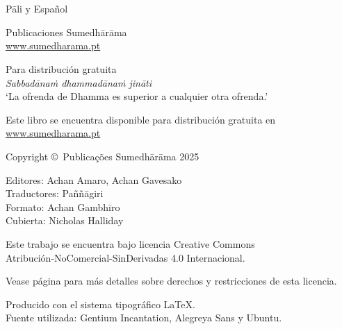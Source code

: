
\thispagestyle{empty}

\enlargethispage{\baselineskip}

{\centering\small
\setlength{\parskip}{15pt}

{\normalsize
\thetitle\\
\thesubtitle\\
Pāli y Español}

Publicaciones Sumedhārāma\\
\href{http://sumedharama.pt}{www.sumedharama.pt}

Para distribución gratuita\\
\textit{Sabbadānaṁ dhammadānaṁ jināti}\\
‘La ofrenda de Dhamma es superior a cualquier otra ofrenda.’

Este libro se encuentra disponible para distribución gratuita en\\
\href{http://sumedharama.pt}{www.sumedharama.pt}


Copyright \copyright\ Publicações Sumedhārāma 2025

Editores: Achan Amaro, Achan Gavesako\\
Traductores: Paññāgiri\\
Formato: Achan Gambhīro\\
Cubierta: Nicholas Halliday

\vfill

Este trabajo se encuentra bajo licencia Creative Commons\\
Atribución-NoComercial-SinDerivadas 4.0 Internacional.

Vease página \pageref{copyright-details} para más detalles sobre derechos y restricciones de esta licencia.

Producido con el sistema tipográfico \LaTeX.\\
Fuente utilizada: Gentium Incantation, Alegreya Sans y Ubuntu.

\theEditionInfo

}
